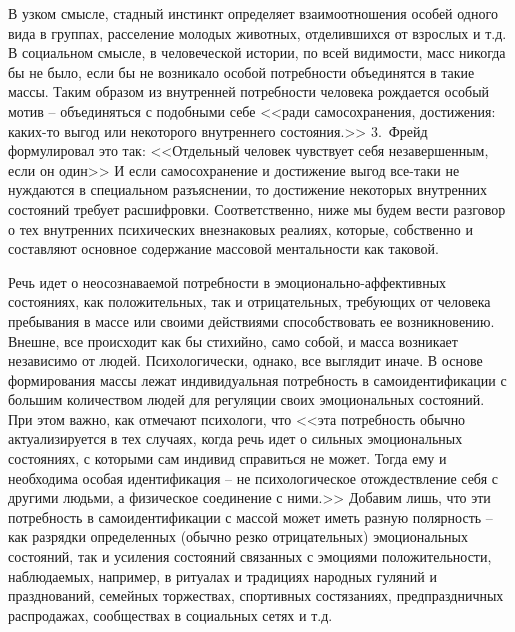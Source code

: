 В узком смысле, стадный инстинкт определяет взаимоотношения особей одного вида в группах, расселение молодых животных,
отделившихся от взрослых и т.д. В социальном смысле, в человеческой истории, по всей видимости, масс никогда бы не
было, если бы не возникало особой потребности объединятся в такие массы. Таким образом из внутренней потребности
человека рождается особый мотив -- объединяться с подобными себе <<ради самосохранения, достижения: каких-то выгод
или некоторого внутреннего состояния.>>\autocite{olshansky} 3.~Фрейд формулировал это так: <<Отдельный человек чувствует
себя незавершенным, если он один>>\autocite{freid_mass} И если самосохранение и достижение выгод все-таки не
нуждаются в специальном разъяснении, то достижение некоторых внутренних состояний требует расшифровки.
Соответственно, ниже мы будем вести разговор о тех внутренних психических внезнаковых реалиях, которые,
собственно и составляют основное содержание массовой ментальности как таковой.

Речь идет о неосознаваемой потребности в эмоционально\hyp{}аффективных состояниях, как положительных,
так и отрицательных, требующих от человека пребывания в массе или своими действиями способствовать ее возникновению.
Внешне, все происходит как бы стихийно, само собой, и масса возникает независимо от людей. Психологически, однако, все выглядит иначе. В основе формирования массы лежат индивидуальная потребность в
самоидентификации с большим количеством людей для регуляции своих эмоциональных состояний. При этом важно, как
отмечают психологи, что <<эта потребность обычно актуализируется в тех случаях, когда речь идет о сильных
эмоциональных состояниях, с которыми сам индивид справиться не может. Тогда ему и необходима особая идентификация --
не психологическое отождествление себя с другими людьми, а физическое соединение с ними.>>\autocite{olshansky} Добавим лишь,
что эти потребность в самоидентификации с массой может иметь разную полярность -- как разрядки определенных
(обычно резко отрицательных) эмоциональных состояний, так и усиления состояний связанных с эмоциями положительности,
наблюдаемых, например, в ритуалах и традициях народных гуляний и празднований, семейных торжествах, спортивных
состязаниях, предпраздничных распродажах, сообществах в социальных сетях и т.д.

